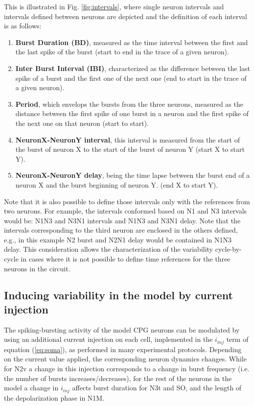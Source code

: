 This is illustrated in Fig. \ref{fig:intervals}, where single neuron intervals and intervals defined between neurons are depicted and the definition of each interval is as follows:
\begin{enumerate}
	\item \textbf{Burst Duration (BD)}, measured as the time interval between the first and the last spike of the burst (start to end in the trace of a given neuron).
	\item \textbf{Inter Burst Interval (IBI)}, characterized as the difference between the last spike of a burst and the first one of the next one (end to start in the trace of a given neuron).
	\item \textbf{Period}, which envelops the bursts from the three neurons, measured as the distance between the first spike of one burst in a neuron and the first spike of the next one on that neuron (start to start).
	\item \textbf{NeuronX-NeuronY interval}, this interval is measured from the start of the burst of neuron X to the start of the burst of neuron Y (start X to start Y).
	\item \textbf{NeuronX-NeuronY delay}, being the time lapse between the burst end of a neuron X and the burst beginning of neuron Y. (end X to start Y).
\end{enumerate}

Note that it is also possible to define those intervals only with the references from two neurons. For example, the intervals conformed based on N1 and N3 intervals would be: N1N3 and N3N1 intervals and N1N3 and N3N1 delay. Note that the intervals corresponding to the third neuron are enclosed in the others defined, e.g., in this example N2 burst and N2N1 delay would be contained in N1N3 delay. This consideration allows the characterization of the variability cycle-by-cycle in cases where it is not possible to define time references for the three neurons in the circuit. 

\subsection{Inducing variability in the model by current injection}
\label{subsec:inj protocol}
The spiking-bursting activity of the model CPG neurons can be modulated by using an additional current injection on each cell, implemented in the \(i_{inj}\) term of equation (\ref{eq:soma}), as performed in many experimental protocols. Depending on the current value applied, the corresponding neuron dynamics changes. While for N2v a change in this injection corresponds to a change in burst frequency (i.e. the number of bursts increases/decreases), for the rest of the neurons in the model a change in \(i_{inj}\) affects burst duration for N3t and SO, and the length of the depolarization phase in N1M.


